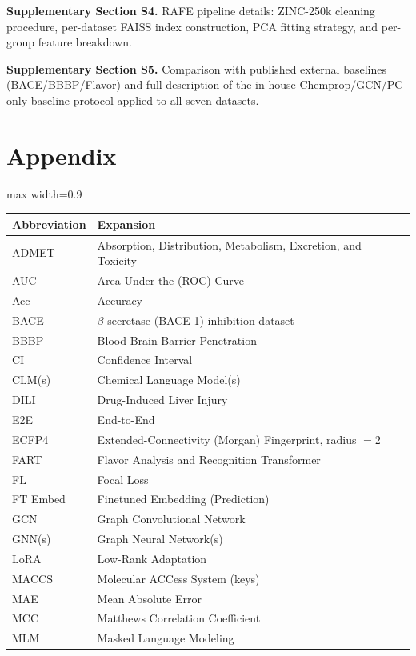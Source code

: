 \documentclass[pdflatex,sn-mathphys-num]{sn-jnl}%
\begin{document}
\noindent\textbf{Supplementary Section S4.} RAFE pipeline details: ZINC-250k cleaning procedure, per-dataset FAISS index construction, PCA fitting strategy, and per-group feature breakdown.

\noindent\textbf{Supplementary Section S5.} Comparison with published external baselines (BACE/BBBP/Flavor) and full description of the in-house Chemprop/GCN/PC-only baseline protocol applied to all seven datasets.

\section*{Appendix}


\begin{table}[!ht]
\begin{adjustbox}{max width=0.9\textwidth}
\begin{tabular}{ll}
\toprule
Abbreviation & Expansion \\
\midrule
ADMET & Absorption, Distribution, Metabolism, Excretion, and Toxicity \\
AUC & Area Under the (ROC) Curve \\
Acc & Accuracy \\
BACE & $\beta$-secretase (BACE-1) inhibition dataset \\
BBBP & Blood-Brain Barrier Penetration \\
CI & Confidence Interval \\
CLM(s) & Chemical Language Model(s) \\
DILI & Drug-Induced Liver Injury \\
E2E & End-to-End \\
ECFP4 & Extended-Connectivity (Morgan) Fingerprint, radius $=2$ \\
FART & Flavor Analysis and Recognition Transformer \\
FL & Focal Loss \\
FT Embed & Finetuned Embedding (Prediction) \\
GCN & Graph Convolutional Network \\
GNN(s) & Graph Neural Network(s) \\
LoRA & Low-Rank Adaptation \\
MACCS & Molecular ACCess System (keys) \\
MAE & Mean Absolute Error \\
MCC & Matthews Correlation Coefficient \\
MLM & Masked Language Modeling \\

\end{tabular}
\end{adjustbox}
\end{table}
\end{document}

